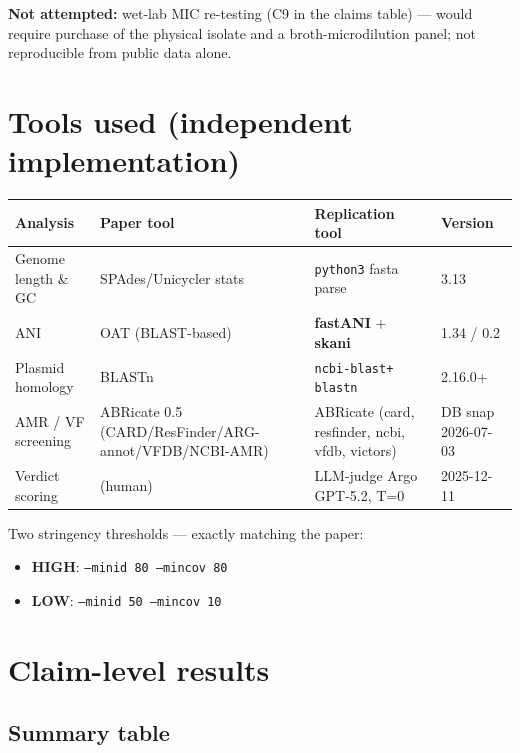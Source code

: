 \documentclass[11pt,letterpaper]{article}
\begin{document}
\textbf{Not attempted:} wet-lab MIC re-testing (C9 in the claims table) --- would require
purchase of the physical isolate and a broth-microdilution panel; not reproducible from
public data alone.

\section{Tools used (independent implementation)}

\begin{longtable}{@{}p{4.5cm}p{4.5cm}p{4cm}p{2cm}@{}}
\toprule
\textbf{Analysis} & \textbf{Paper tool} & \textbf{Replication tool} & \textbf{Version} \\
\midrule
Genome length \& GC       & SPAdes/Unicycler stats             & \texttt{python3} fasta parse           & 3.13 \\
ANI                       & OAT (BLAST-based)                  & \textbf{fastANI} + \textbf{skani}      & 1.34 / 0.2 \\
Plasmid homology          & BLASTn                             & \texttt{ncbi-blast+ blastn}            & 2.16.0+ \\
AMR / VF screening        & ABRicate 0.5 (CARD/ResFinder/ARG-annot/VFDB/NCBI-AMR) & ABRicate (card, resfinder, ncbi, vfdb, victors) & DB snap 2026-07-03 \\
Verdict scoring           & (human)                            & LLM-judge Argo GPT-5.2, T=0            & 2025-12-11 \\
\bottomrule
\end{longtable}

Two stringency thresholds --- exactly matching the paper:
\begin{itemize}[nosep]
  \item \textbf{HIGH}: \texttt{--minid 80 --mincov 80}
  \item \textbf{LOW}:  \texttt{--minid 50 --mincov 10}
\end{itemize}

\section{Claim-level results}

\subsection{Summary table}
\end{document}
